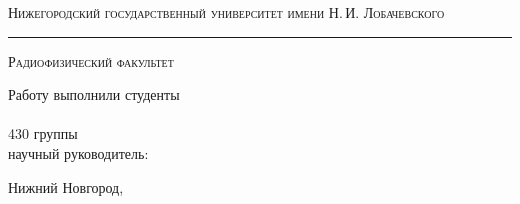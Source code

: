 \begin{titlepage}

\begin{center}

	\textsc{Нижегородский государственный университет имени Н.\,И. Лобачевского}
	\vskip 4pt \hrule \vskip 8pt
	\textsc{Радиофизический факультет}

	\vfill

	{\Large\labname}

\end{center}

\vfill

\begin{flushright}
	{Работу выполнили студенты\\ \authors\\ 430 группы\\ \vskip 14pt научный руководитель:\\ \sciadviser}
\end{flushright}

\vfill

\begin{center}
	Нижний Новгород, \the\year
\end{center}

\end{titlepage}